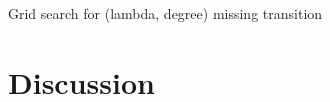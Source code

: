 \documentclass[10pt,conference,compsocconf]{IEEEtran}
\begin{document}
\begin{comment}
  \multicolumn{1}{l|}{Accuracy} &
  \multicolumn{1}{l|}{F1-score} &
  \multicolumn{1}{l|}{Accuracy} \\ \hline
\multicolumn{1}{|l|}{PRI\_jet\_0\_0} &
  1e-8 &
  10 &
  median &
  \multirow{6}{*}{61.66\%} &
  \multirow{6}{*}{87.76\%} &
  \multirow{6}{*}{59.05\%} &
  \multirow{6}{*}{87.20\%} &
  \multirow{6}{*}{75.30\%} &
  \multirow{6}{*}{83.50\%} \\ \cline{1-4}
\multicolumn{1}{|l|}{PRI\_jet\_0\_1}    & 1e-14     & 10     & median     &               &               &                &                &               &              \\ \cline{1-4}
\multicolumn{1}{|l|}{PRI\_jet\_1\_0}    & 1e-8      & 6      & mode       &               &               &                &                &               &              \\ \cline{1-4}
\multicolumn{1}{|l|}{PRI\_jet\_1\_1}    & 1e-16     & 10     & mode       &               &               &                &                &               &              \\ \cline{1-4}
\multicolumn{1}{|l|}{PRI\_jet\_2\_3\_0} & 1e-3      & 3      & mode       &               &               &                &                &               &              \\ \cline{1-4}
\multicolumn{1}{|l|}{PRI\_jet\_2\_3\_1} & 1e-15     & 11     & mode       &               &               &                &                &               &              \\ \hline
\end{tabular}%
}
\caption{Parameters, F1-score and accuracy results.}
\label{tab:6_models}
\end{table}
\end{comment}

\FloatBarrier
Grid search for (lambda, degree)
missing transition

\section{Discussion}
\end{document}
